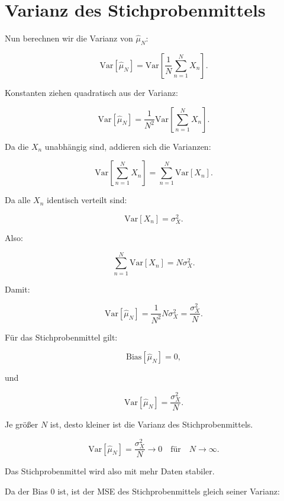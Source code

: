 \section{Varianz des Stichprobenmittels}

Nun berechnen wir die Varianz von \(\hat{\mu}_N\):

\[
    \mathrm{Var}[\hat{\mu}_N]
    =
    \mathrm{Var}\left[
        \frac{1}{N}
        \sum_{n=1}^{N}
        X_n
    \right].
\]

Konstanten ziehen quadratisch aus der Varianz:

\[
    \mathrm{Var}[\hat{\mu}_N]
    =
    \frac{1}{N^2}
    \mathrm{Var}\left[
        \sum_{n=1}^{N}
        X_n
    \right].
\]

Da die \(X_n\) unabhängig sind, addieren sich die Varianzen:

\[
    \mathrm{Var}\left[
        \sum_{n=1}^{N}
        X_n
    \right]
    =
    \sum_{n=1}^{N}
    \mathrm{Var}[X_n].
\]

Da alle \(X_n\) identisch verteilt sind:

\[
    \mathrm{Var}[X_n] = \sigma_X^2.
\]

Also:

\[
    \sum_{n=1}^{N}
    \mathrm{Var}[X_n]
    =
    N\sigma_X^2.
\]

Damit:

\[
    \mathrm{Var}[\hat{\mu}_N]
    =
    \frac{1}{N^2}
    N\sigma_X^2
    =
    \frac{\sigma_X^2}{N}.
\]

\begin{definitionbox}
Für das Stichprobenmittel gilt:

\[
    \mathrm{Bias}[\hat{\mu}_N] = 0,
\]

und

\[
    \mathrm{Var}[\hat{\mu}_N]
    =
    \frac{\sigma_X^2}{N}.
\]
\end{definitionbox}

\begin{conceptbox}
Je größer \(N\) ist, desto kleiner ist die Varianz des Stichprobenmittels.

\[
    \mathrm{Var}[\hat{\mu}_N]
    =
    \frac{\sigma_X^2}{N}
    \longrightarrow
    0
    \quad
    \text{für}
    \quad
    N \to \infty.
\]

Das Stichprobenmittel wird also mit mehr Daten stabiler.
\end{conceptbox}

Da der Bias \(0\) ist, ist der MSE des Stichprobenmittels gleich seiner Varianz:

